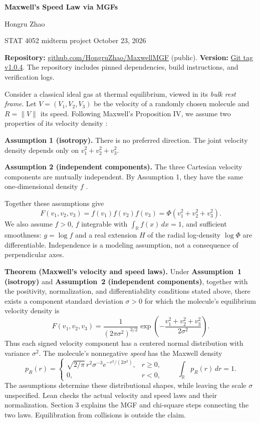 \documentclass[11pt,letterpaper]{article}
\newcommand{\R}{\mathbb R}
\newcommand{\heading}[1]{\par\medskip{\large\bfseries\color{navy}#1}\par\smallskip}
\begin{document}
{\LARGE\bfseries\color{navy} Maxwell's Speed Law via MGFs}\par
{\large Hongru Zhao}\par
STAT 4052 midterm project \hfill October 23, 2026\par
\textbf{Repository:} \href{https://github.com/HongruZhao/MaxwellMGF}{github.com/HongruZhao/MaxwellMGF} (public).
\textbf{Version:} \href{https://github.com/HongruZhao/MaxwellMGF/tree/v1.0.4}{Git tag v1.0.4}. The repository includes pinned dependencies, build instructions, and verification logs.

\heading{1. Ideal-gas model and physical conclusion}
Consider a classical ideal gas at thermal equilibrium, viewed in its \emph{bulk rest frame}. Let $V=(V_1,V_2,V_3)$ be the velocity of a randomly chosen molecule and $R=\|V\|$ its speed. Following Maxwell's Proposition IV, we assume two properties of its velocity density \cite{maxwell}:

\textbf{Assumption 1 (isotropy).} There is no preferred direction. The joint velocity density depends only on $v_1^2+v_2^2+v_3^2$.

\textbf{Assumption 2 (independent components).} The three Cartesian velocity components are mutually independent. By Assumption 1, they have the same one-dimensional density $f$ \cite{indep}.

Together these assumptions give
\begin{equation}\label{model}
 F(v_1,v_2,v_3)=f(v_1)f(v_2)f(v_3)
              =\Phi(v_1^2+v_2^2+v_3^2).
\end{equation}
We also assume $f>0$, $f$ integrable with $\int_\R f(x)\,dx=1$, and sufficient smoothness: $g=\log f$ and a real extension $H$ of the radial log-density $\log\Phi$ are differentiable. Independence is a modeling assumption, not a consequence of perpendicular axes.

\textbf{Theorem (Maxwell's velocity and speed laws).}
Under \textbf{Assumption~1 (isotropy)} and \textbf{Assumption~2 (independent components)}, together with the positivity, normalization, and differentiability conditions stated above, there exists a component standard deviation $\sigma>0$ for which the molecule's equilibrium velocity density is
\begin{equation}\label{normal}
 F(v_1,v_2,v_3)=\frac{1}{(2\pi\sigma^2)^{3/2}}
       \exp\!\left(-\frac{v_1^2+v_2^2+v_3^2}{2\sigma^2}\right).
\end{equation}
Thus each signed velocity component has a centered normal distribution with variance $\sigma^2$. The molecule's nonnegative \emph{speed} has the Maxwell density
\begin{equation}\label{maxwell}
 p_R(r)=
 \begin{cases}\sqrt{2/\pi}\,r^2\sigma^{-3}e^{-r^2/(2\sigma^2)},&r\ge0,\\0,&r<0,\end{cases}
 \qquad \int_\R p_R(r)\,dr=1.
\end{equation}
The assumptions determine these distributional shapes, while leaving the scale $\sigma$ unspecified. Lean checks the actual velocity and speed laws and their normalization. Section 3 explains the MGF and chi-square steps connecting the two laws. Equilibration from collisions is outside the claim.
\end{document}
